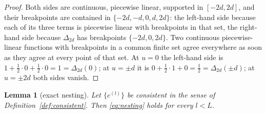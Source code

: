 \documentclass[11pt,a4paper]{article}
\theoremstyle{plain}
\newtheorem{lemma}[theorem]{Lemma}
\theoremstyle{definition}
\begin{document}
\begin{proof}
Both sides are continuous, piecewise linear, supported in $[-2d,2d]$, and their
breakpoints are contained in $\{-2d,-d,0,d,2d\}$: the left-hand side because each of
its three terms is piecewise linear with breakpoints in that set, the right-hand side
because $\Delta_{2d}$ has breakpoints $\{-2d,0,2d\}$. Two continuous piecewise-linear
functions with breakpoints in a common finite set agree everywhere as soon as they
agree at every point of that set. At $u=0$ the left-hand side is
$1+\tfrac12\cdot0+\tfrac12\cdot0=1=\Delta_{2d}(0)$; at $u=\pm d$ it is
$0+\tfrac12\cdot1+0=\tfrac12=\Delta_{2d}(\pm d)$; at $u=\pm2d$ both sides vanish.
\end{proof}

\begin{lemma}[exact nesting]
\label{lem:nesting}
Let $\{c^{(l)}\}$ be consistent in the sense of Definition~\ref{def:consistent}. Then
\eqref{eq:nesting} holds for every $l<L$.
\end{lemma}
\end{document}

